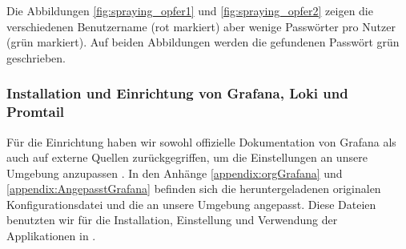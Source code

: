 Die Abbildungen \ref{fig:spraying_opfer1} und \ref{fig:spraying_opfer2} zeigen die verschiedenen Benutzername (rot markiert) aber wenige Passwörter pro Nutzer (grün markiert). Auf beiden Abbildungen werden die gefundenen Passwört grün geschrieben.

\newpage
\subsubsection{Installation und Einrichtung von Grafana, Loki und Promtail}
Für die Einrichtung haben wir sowohl offizielle Dokumentation von Grafana als auch auf externe Quellen zurückgegriffen, um die Einstellungen an unsere Umgebung anzupassen \citep{Polinowski_PGL}. In den Anhänge \ref{appendix:orgGrafana} und \ref{appendix:AngepasstGrafana} befinden sich die heruntergeladenen originalen Konfigurationsdatei und die an unsere Umgebung angepasst. Diese Dateien benutzten wir für die Installation, Einstellung und Verwendung der Applikationen in .







